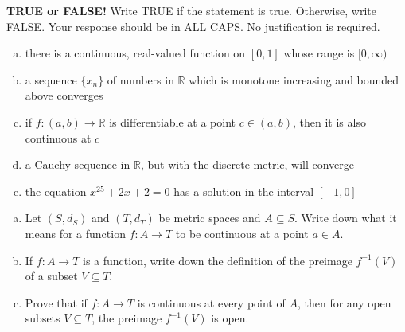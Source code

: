 \documentclass[11pt]{exam}
\theoremstyle{definition}
\begin{document}

\begin{questions}

\addpoints

\question[10]\mbox{}
\textbf{TRUE or FALSE!}  Write  TRUE if the statement is true.  Otherwise, write FALSE.  Your response should be in ALL CAPS.  No justification is required.
\begin{enumerate}[(a)]
\item there is a continuous, real-valued function on $[0,1]$ whose range is $[0,\infty)$
\vspace{1.2in}
\item a sequence $\{x_n\}$ of numbers in $\mathbb{R}$ which is monotone increasing and bounded above converges
\vspace{1.2in}
\item if $f: (a,b)\rightarrow\mathbb{R}$ is differentiable at a point $c\in (a,b)$, then it is also continuous at $c$
\vspace{1.2in}
\item a Cauchy sequence in $\mathbb{R}$, but with the discrete metric, will converge
\vspace{1.2in}
\item the equation $x^{25}+2x+2=0$ has a solution in the interval $[-1,0]$
\vspace{1.2in}
\end{enumerate}

\newpage
\question[10]\mbox{}

\begin{enumerate}[(a)]
\item
Let $(S,d_S)$ and $(T,d_T)$ be metric spaces and $A\subseteq S$.
Write down what it means for a function $f: A\rightarrow T$ to be continuous at a point $a\in A$.
\vspace{2in}
\item 
If $f: A\rightarrow T$ is a function, write down the definition of the preimage $f^{-1}(V)$ of a subset $V\subseteq T$.
\vspace{2in}
\item 
Prove that if $f: A\rightarrow T$ is continuous at every point of $A$, then for any open subsets $V\subseteq T$, the preimage $f^{-1}(V)$ is open.
\end{enumerate}

\newpage
\question[10]\mbox{}


\end{questions}
\end{document}
